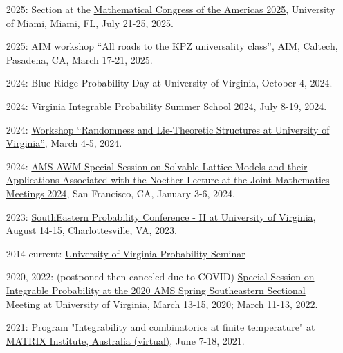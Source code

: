 \documentclass[letterpaper,11pt]{article}
\begin{document}
\begin{itemize}
	\item [2025:]
	Section at the
	\href{https://www.math.miami.edu/mca/}{Mathematical Congress of the Americas 2025},
	University of Miami,
	Miami, FL,
	July 21-25, 2025.

	\item [2025:]
	AIM workshop
	``All roads to the KPZ universality class'',
	AIM, Caltech, Pasadena, CA, March 17-21, 2025.

	\item [2024:]
	Blue Ridge Probability Day at University of Virginia,
	October 4, 2024.

	\item [2024:]
	\href{https://lpetrov.cc/vipss2024/}{Virginia Integrable Probability Summer School 2024},
	July 8-19, 2024.

	\item [2024:]
	\href{https://math.virginia.edu/random-lie-2024/}{Workshop ``Randomness and Lie-Theoretic Structures at University of Virginia''},
	March 4-5, 2024.

	\item [2024:]
\href{https://www.jointmathematicsmeetings.org/meetings/national/jmm2024/2300_program_ss43.html}{AMS-AWM Special Session on Solvable Lattice Models and their Applications Associated with the Noether Lecture at the Joint Mathematics Meetings 2024},
San Francisco, CA, January 3-6, 2024.

\item [2023:]
\href{https://sites.google.com/view/sepc2023ii/sepc-2023-ii}{SouthEastern Probability Conference - II at University of Virginia},
August 14-15, Charlottesville, VA, 2023.

\item [2014-current:]
\href{http://math.virginia.edu/seminars/probability/}{University of Virginia Probability Seminar}

\item [2020, 2022:]
(postponed then canceled due to COVID)
\href{http://www.ams.org/meetings/sectional/2273_program.html}{Special Session on Integrable Probability at the 2020 AMS Spring Southeastern Sectional Meeting at University of Virginia},
March 13-15, 2020; March 11-13, 2022.

\item [2021:]
\href{https://www.matrix-inst.org.au/events/integrability-and-combinatorics-at-finite-temperature/}{Program "Integrability and combinatorics at finite temperature" at MATRIX Institute, Australia (virtual)},
June 7-18, 2021.


\end{itemize}
\end{document}

